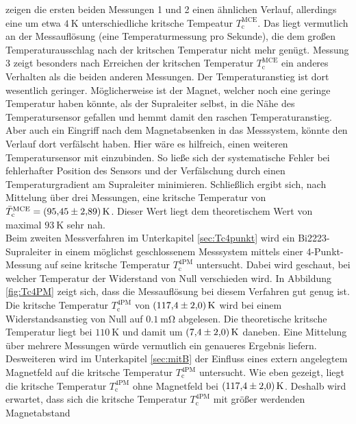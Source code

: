 zeigen die ersten beiden Messungen 1 und 2 einen ähnlichen Verlauf, allerdings
eine um etwa $\SI{4}{\kelvin}$ unterschiedliche kritsche Tempeatur $T^{\text{MCE}}_{\text{c}}$.
Das liegt vermutlich an der Messauflösung (eine Temperaturmessung pro Sekunde),
die dem großen Temperaturausschlag nach der kritschen Temperatur nicht mehr genügt.
Messung 3 zeigt besonders nach Erreichen der kritschen Temperatur $T^{\text{MCE}}_{\text{c}}$
ein anderes Verhalten als die beiden anderen Messungen. Der Temperaturanstieg
ist dort wesentlich geringer. Möglicherweise ist der Magnet, welcher noch eine
geringe Temperatur haben könnte, als der Supraleiter selbst, in die Nähe des
Temperatursensor gefallen und hemmt damit den raschen Temperaturanstieg. Aber auch
ein Eingriff nach dem Magnetabsenken in das Messsystem, könnte den Verlauf dort
verfälscht haben.
Hier wäre es hilfreich, einen weiteren Temperatursensor mit einzubinden.
So ließe sich der systematische Fehler bei fehlerhafter Position des Sensors und
der Verfälschung durch einen Temperaturgradient am Supraleiter minimieren.
Schließlich ergibt sich, nach Mittelung über drei Messungen, eine kritsche Temperatur
von $\bar{T}^{\text{MCE}}_{\text{c}} = \SI{95.45\pm2.89}{\kelvin}$. Dieser Wert
liegt dem theoretischem Wert von maximal $\SI{93}{\kelvin}$ \cite[S. 62]{Hohenester}
sehr nah. \\
Beim zweiten Messverfahren im Unterkapitel \ref{sec:Tc4punkt} wird ein
Bi2223-Supraleiter in einem möglichst geschlossenem Messsystem mittels einer
4-Punkt-Messung auf seine kritsche Temperatur $T^{\text{4PM}}_{\text{c}}$
untersucht. Dabei wird geschaut, bei welcher Temperatur der Widerstand von Null
verschieden wird. In Abbildung \ref{fig:Tc4PM} zeigt sich, dass die Messauflösung
bei diesem Verfahren gut genug ist. Die kritsche Temperatur $T^{\text{4PM}}_{\text{c}}$ von
$\SI{117,4\pm2}{\kelvin}$ wird bei einem Widerstandsanstieg von Null auf $\SI{0.1}{\milli\ohm}$
abgelesen. Die theoretische kritsche Temperatur liegt bei $\SI{110}{\kelvin}$
\cite[S. 64]{Hohenester} und damit um $\SI{7,4\pm2}{\kelvin}$ daneben. Eine Mittelung
über mehrere Messungen würde vermutlich ein genaueres Ergebnis liefern.\\
Desweiteren wird im Unterkapitel \ref{sec:mitB} der Einfluss eines extern
angelegtem Magnetfeld auf die kritsche Temperatur $T^{\text{4PM}}_{\text{c}}$ untersucht.
Wie eben gezeigt, liegt die kritsche Temperatur $T^{\text{4PM}}_{\text{c}}$ ohne
Magnetfeld bei $\SI{117,4\pm2}{\kelvin}$. Deshalb wird erwartet, dass sich
die kritsche Temperatur $T^{\text{4PM}}_{\text{c}}$ mit größer werdenden Magnetabstand
